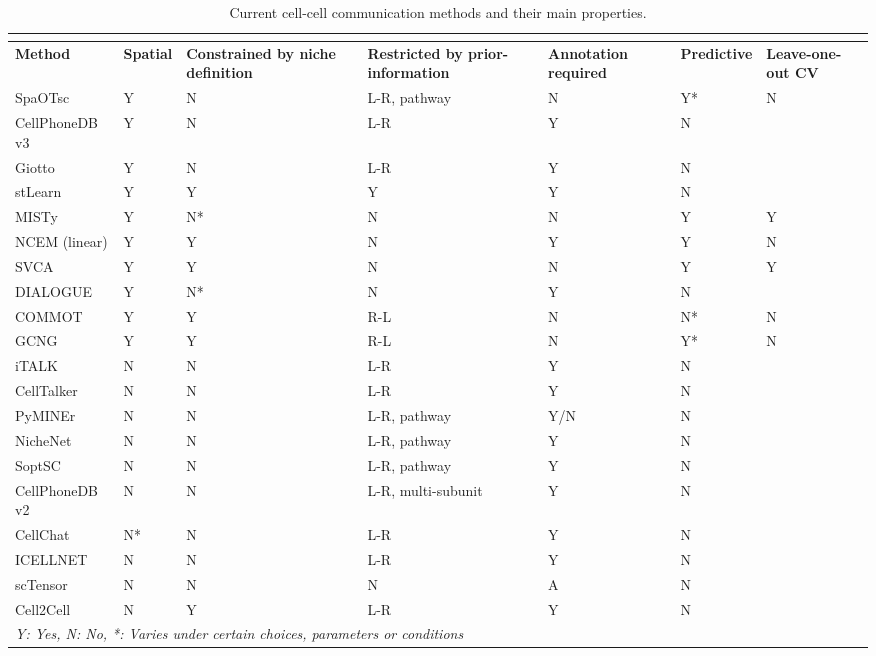 {\scriptsize
    \begin{longtable}[l]{ l l p{2cm} p{2.5cm} p{2cm} l p{2cm} }
        \caption{Current cell-cell communication methods and their main properties.} \\
        \label{tab:ccc2} \\
        \hline
        \textbf{Method} & \textbf{Spatial} & \textbf{Constrained by niche \newline definition} & \textbf{Restricted by prior-information} & \textbf{Annotation required} & \textbf{Predictive} & \textbf{Leave-one-out CV} \\ \hline
        SpaOTsc & Y & N & L-R, pathway & N & Y* & N \\
        CellPhoneDB v3 & Y & N & L-R & Y & N & ~ \\
        Giotto & Y & N & L-R & Y & N & ~ \\
        stLearn & Y & Y & Y & Y & N & ~ \\
        MISTy & Y & N* & N & N & Y & Y \\
        NCEM (linear) & Y & Y & N & Y & Y & N \\
        SVCA & Y & Y & N & N & Y & Y \\
        DIALOGUE & Y & N* & N & Y & N & ~ \\
        COMMOT & Y & Y & R-L & N & N* & N \\
        GCNG & Y & Y & R-L & N & Y* & N \\
        iTALK & N & N & L-R & Y & N & ~ \\
        CellTalker & N & N & L-R & Y & N & ~ \\
        PyMINEr & N & N & L-R, pathway & Y/N & N & ~ \\
        NicheNet & N & N & L-R, pathway & Y & N & ~ \\
        SoptSC & N & N & L-R, pathway & Y & N & ~ \\
        CellPhoneDB v2 & N & N & L-R, multi-subunit & Y & N & ~ \\
        CellChat & N* & N & L-R & Y & N & ~ \\
        ICELLNET & N & N & L-R & Y & N & ~ \\
        scTensor & N & N & N & A & N & ~ \\
        Cell2Cell & N & Y & L-R & Y & N & ~ \\[0.4cm]
        \multicolumn{4}{l}{\scriptsize \itshape Y: Yes, N: No, *: Varies under certain choices, parameters or conditions} \\
    \end{longtable}
}

